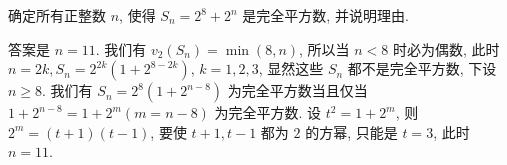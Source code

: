 \begin{prob}
\label{prob:prob-12}
确定所有正整数 $n$, 使得 $S_n = 2^8 + 2^n$ 是完全平方数, 并说明理由.
\end{prob}

\begin{soln}
答案是 $\boxed{n = 11.}$ 我们有 $v_2(S_n) = \min(8,n)$,
所以当 $n < 8$ 时必为偶数, 此时 $n = 2k, S_n = 2^{2k}(1 + 2^{8-2k})$,
$k = 1, 2, 3$, 显然这些 $S_n$ 都不是完全平方数, 下设 $n \ge 8$.
我们有 $S_n = 2^8(1 + 2^{n-8})$ 为完全平方数当且仅当
$1 + 2^{n-8} = 1 + 2^m (m = n - 8)$ 为完全平方数.
设 $t^2 = 1 + 2^m$, 则 $2^m = (t+1)(t-1)$,
要使 $t + 1, t - 1$ 都为 $2$ 的方幂,
只能是 $t = 3$, 此时 $n = 11$.
\end{soln}
